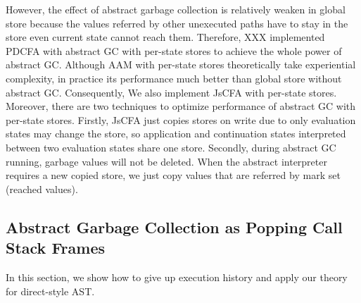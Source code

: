 \documentclass{article}
\begin{document}
However, the effect of abstract garbage collection is relatively weaken in global store because the values referred by other unexecuted paths have to stay in the store even current state cannot reach them. Therefore, XXX implemented PDCFA with abstract GC with per-state stores to achieve the whole power of abstract GC\@. Although AAM with per-state stores theoretically take experiential complexity, in practice its performance much better than global store without abstract GC\@.
Consequently, We also implement JsCFA with per-state stores. Moreover, there are two techniques to optimize performance of abstract GC with per-state stores. Firstly, JsCFA just copies stores on write due to only evaluation states may change the store, so application and continuation states interpreted between two evaluation states share one store. Secondly, during abstract GC running, garbage values will not be deleted. When the abstract interpreter requires a new copied store, we just copy values that are referred by mark set (reached values).
\subsection{Abstract Garbage Collection as Popping Call Stack Frames}
\label{sub:Abstract Garbage Collection as Popping Call Stack Frames}
In this section, we show how to give up execution history and apply our theory for direct-style AST\@.
\end{document}

